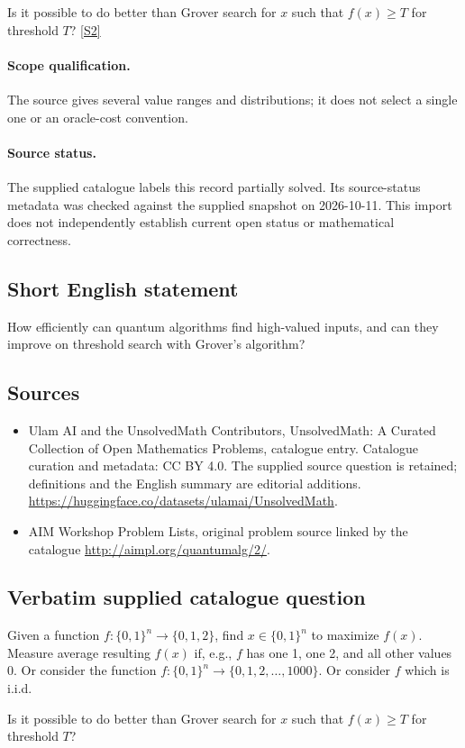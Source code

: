 \documentclass[11pt]{article}
\begin{document}
Is it possible to do better than Grover search for $x$ such that $f(x) \geq T$ for threshold $T$? \href{http://aimpl.org/quantumalg/2/}{[S2]}
\paragraph{Scope qualification.}
The source gives several value ranges and distributions; it does not select a single one or an oracle-cost convention.
\paragraph{Source status.}
The supplied catalogue labels this record partially solved. Its source-status metadata was checked against the supplied snapshot on 2026-10-11. This import does not independently establish current open status or mathematical correctness.
\subsection{Short English statement}
How efficiently can quantum algorithms find high-valued inputs, and can they improve on threshold search with Grover's algorithm?
\subsection{Sources}
\begin{itemize}
\item[S1] Ulam AI and the UnsolvedMath Contributors, UnsolvedMath: A Curated Collection of Open Mathematics Problems, catalogue entry. Catalogue curation and metadata: CC BY 4.0. The supplied source question is retained; definitions and the English summary are editorial additions.
\url{https://huggingface.co/datasets/ulamai/UnsolvedMath}.
\item[S2] AIM Workshop Problem Lists, original problem source linked by the catalogue
\url{http://aimpl.org/quantumalg/2/}.
\end{itemize}
\subsection{Verbatim supplied catalogue question}
Given a function $f:\{0,1\}^n \to \{0,1,2\}$, find $x\in \{0,1\}^n$ to maximize $f(x)$. Measure average resulting $f(x)$ if, e.g., $f$ has one 1, one 2, and all other values 0. Or consider the function $f:\{0,1\}^n \to \{0,1,2, \dots, 1000\}$. Or consider $f$ which is i.i.d.

Is it possible to do better than Grover search for $x$ such that $f(x) \geq T$ for threshold $T$?
\end{document}
